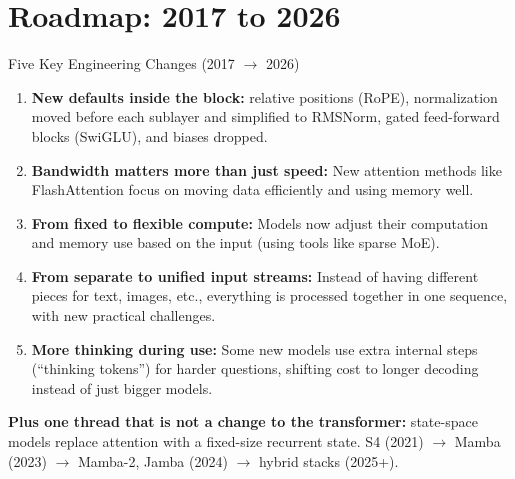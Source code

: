\section{Roadmap: 2017 to 2026}

\begin{frame}{Five Key Engineering Changes (2017 $\to$ 2026)}
  \begin{enumerate}\itemsep0.1em
    \item \textbf{New defaults inside the block:} relative positions (RoPE), normalization moved before each sublayer and simplified to RMSNorm, gated feed-forward blocks (SwiGLU), and biases dropped.
    \item \textbf{Bandwidth matters more than just speed:} New attention methods like FlashAttention focus on moving data efficiently and using memory well.
    \item \textbf{From fixed to flexible compute:} Models now adjust their computation and memory use based on the input (using tools like sparse MoE).
    \item \textbf{From separate to unified input streams:} Instead of having different pieces for text, images, etc., everything is processed together in one sequence, with new practical challenges.
    \item \textbf{More thinking during use:} Some new models use extra internal steps (``thinking tokens'') for harder questions, shifting cost to longer decoding instead of just bigger models.
  \end{enumerate}
  \vfill
  {\scriptsize \textbf{Plus one thread that is not a change to the transformer:} state-space models replace attention with a fixed-size recurrent state. S4 (2021) $\to$ Mamba (2023) $\to$ Mamba-2, Jamba (2024) $\to$ hybrid stacks (2025+).}
\end{frame}
